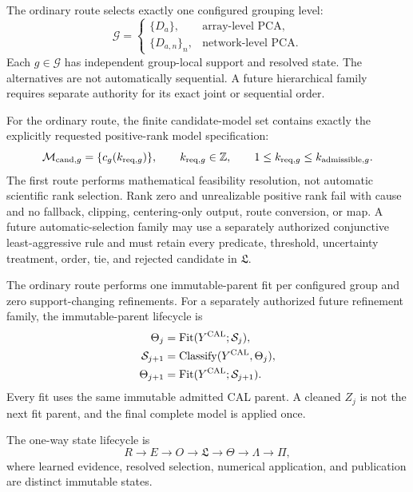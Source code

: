 The ordinary route selects exactly one configured grouping level:
\begin{equation}
\mathcal G=
\begin{cases}
\{D_a\},&\text{array-level PCA},\\
\{D_{a,n}\}_n,&\text{network-level PCA}.
\end{cases}
\label{eq:hierarchy}
\end{equation}
Each $g\in\mathcal G$ has independent group-local support and resolved state.
The alternatives are not automatically sequential. A future hierarchical
family requires separate authority for its exact joint or sequential order.

For the ordinary route, the finite candidate-model set contains exactly the
explicitly requested positive-rank model specification:
\begin{equation}
\mathcal M_{{\rm cand},g}=\{c_g(k_{{\rm req},g})\},
\qquad
k_{{\rm req},g}\in\mathbb Z,
\qquad
1\le k_{{\rm req},g}\le k_{{\rm admissible},g}.
\label{eq:conjunctive-selection}
\end{equation}
The first route performs mathematical feasibility resolution, not automatic
scientific rank selection. Rank zero and unrealizable positive rank fail with
cause and no fallback, clipping, centering-only output, route conversion, or
map. A future automatic-selection family may use a separately authorized
conjunctive least-aggressive rule and must retain every predicate, threshold,
uncertainty treatment, order, tie, and rejected candidate in $\mathfrak L$.

The ordinary route performs one immutable-parent fit per configured group and
zero support-changing refinements. For a separately authorized future
refinement family, the immutable-parent lifecycle is
\begin{align}
\Theta_j&=\operatorname{Fit}(Y^{\rm CAL};\mathcal S_j),\nonumber\\
\mathcal S_{j+1}&=\operatorname{Classify}(Y^{\rm CAL},\Theta_j),\nonumber\\
\Theta_{j+1}&=\operatorname{Fit}(Y^{\rm CAL};\mathcal S_{j+1}).
\label{eq:immutable-refit}
\end{align}
Every fit uses the same immutable admitted CAL parent. A cleaned $Z_j$ is not
the next fit parent, and the final complete model is applied once.

The one-way state lifecycle is
\begin{equation}
R\longrightarrow E\longrightarrow O\longrightarrow
\mathfrak L\longrightarrow\Theta\longrightarrow\Lambda\longrightarrow\Pi ,
\label{eq:lifecycle}
\end{equation}
where learned evidence, resolved selection, numerical application, and
publication are distinct immutable states.


